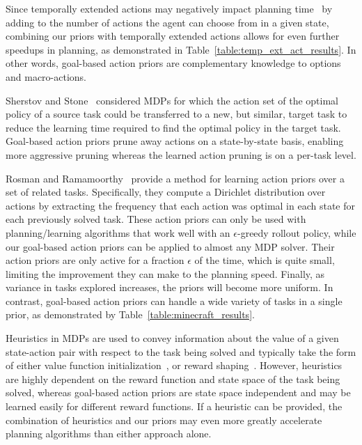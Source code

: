 \documentclass[11pt]{article}
\begin{document}
Since temporally extended actions may negatively impact planning
time~\cite{Jong:2008zr} by adding to the number of actions the agent
can choose from in a given state, combining our priors with
temporally extended actions allows for even further speedups in
planning, as demonstrated in Table~\ref{table:temp_ext_act_results}. In
other words, goal-based action priors are complementary knowledge to options and
macro-actions.

Sherstov and Stone~\cite{sherstov2005improving} considered MDPs for
which the action set of the optimal policy of a source task could be
transferred to a new, but similar, target task to reduce the learning
time required to find the optimal policy in the target task.
Goal-based action priors prune away actions on a state-by-state basis, enabling
more aggressive pruning whereas the learned action pruning is on a per-task
level.

Rosman and Ramamoorthy~\cite{rosman2012good} provide a method for
learning action priors over a set of related tasks. Specifically, they
compute a Dirichlet distribution over actions by extracting the
frequency that each action was optimal in each state for each
previously solved task.  These action priors can only be used with
planning/learning algorithms that work well with an $\epsilon$-greedy
rollout policy, while our goal-based action priors can be applied to almost any MDP
solver.  Their action priors are only active for a fraction $\epsilon$ of the time,
which is quite small, limiting the improvement they
can make to the planning speed.  Finally, as variance in tasks
explored increases, the priors will become more uniform. In contrast,
goal-based action priors can handle a wide variety of tasks in a
single prior, as demonstrated by
Table~\ref{table:minecraft_results}.

Heuristics in MDPs are used to convey information about the value of a
given state-action pair with respect to the task being solved and
typically take the form of either value function
initialization~\cite{Hansen:1999qf}, or reward shaping~\cite{potshap}.
However, heuristics are highly dependent on the reward function and
state space of the task being solved, whereas goal-based action priors are state
space independent and may be learned easily for different reward
functions. If a heuristic can be provided, the combination of
heuristics and our priors may even more greatly accelerate planning
algorithms than either approach alone.

\end{document}
